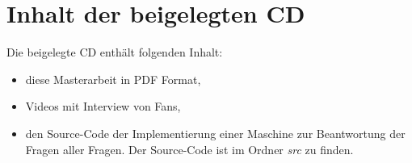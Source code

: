 \documentclass{thesisPST}
\begin{document}
\listoftables
{}
{} %

\chapter{Inhalt der beigelegten CD}
Die beigelegte CD enthält folgenden Inhalt:
\begin{itemize}
	\item diese Masterarbeit in PDF Format,
	\item Videos mit Interview von Fans,
	\item den Source-Code der Implementierung einer Maschine zur Beantwortung der Fragen aller Fragen. Der Source-Code ist im Ordner \emph{src} zu finden.
\end{itemize}

\cleardoublepage
{}
{} %

\end{document}
